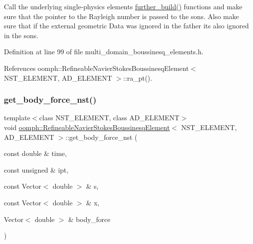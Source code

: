 Call the underlying single-\/physics element\textquotesingle{}s \hyperlink{classoomph_1_1RefineableNavierStokesBoussinesqElement_a8b7b18f473b0fa9c4127de305e5a6ccc}{further\+\_\+build()} functions and make sure that the pointer to the Rayleigh number is passed to the sons. Also make sure that if the external geometric Data was ignored in the father it\textquotesingle{}s also ignored in the sons. 



Definition at line 99 of file multi\+\_\+domain\+\_\+boussinesq\+\_\+elements.\+h.



References oomph\+::\+Refineable\+Navier\+Stokes\+Boussinesq\+Element$<$ N\+S\+T\+\_\+\+E\+L\+E\+M\+E\+N\+T, A\+D\+\_\+\+E\+L\+E\+M\+E\+N\+T $>$\+::ra\+\_\+pt().

\mbox{\label{classoomph_1_1RefineableNavierStokesBoussinesqElement_a7c422f8666f9acef4d26f187a4dc4e28}} 
\subsubsection{\texorpdfstring{get\+\_\+body\+\_\+force\+\_\+nst()}{get\_body\_force\_nst()}}
{\footnotesize\ttfamily template$<$class N\+S\+T\+\_\+\+E\+L\+E\+M\+E\+NT, class A\+D\+\_\+\+E\+L\+E\+M\+E\+NT$>$ \\
void \hyperlink{classoomph_1_1RefineableNavierStokesBoussinesqElement}{oomph\+::\+Refineable\+Navier\+Stokes\+Boussinesq\+Element}$<$ N\+S\+T\+\_\+\+E\+L\+E\+M\+E\+NT, A\+D\+\_\+\+E\+L\+E\+M\+E\+NT $>$\+::get\+\_\+body\+\_\+force\+\_\+nst (\begin{DoxyParamCaption}\item[{const double \&}]{time,  }\item[{const unsigned \&}]{ipt,  }\item[{const Vector$<$ double $>$ \&}]{s,  }\item[{const Vector$<$ double $>$ \&}]{x,  }\item[{Vector$<$ double $>$ \&}]{body\+\_\+force }\end{DoxyParamCaption})\hspace{0.3cm}{\ttfamily [inline]}}



